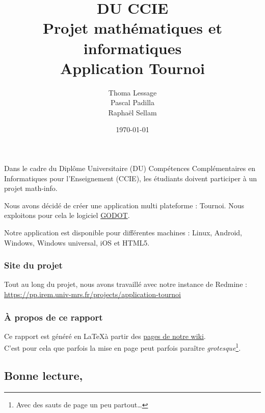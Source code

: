 \documentclass[10pt]{article}
\title{%
DU CCIE
\\
{\normalsize Projet mathématiques et informatiques}
\\
Application Tournoi}
\author{    Thoma Lessage\\
            Pascal Padilla\\
            Raphaël Sellam
    }
\date{\today}
\begin{document}
\pagecolor{orangeamu!25}
\maketitle\thispagestyle{empty}





\newpage\pagecolor{orangeamu!10}
\tableofcontents






\newpage


Dans le cadre du Diplôme Universitaire (DU) Compétences Complémentaires en Informatiques pour l'Enseignement (CCIE), les étudiants doivent participer à un projet math-info.

Nous avons décidé de créer une application multi plateforme : Tournoi. Nous exploitons pour cela le logiciel \href{https://godotengine.org/}{GODOT}.

Notre application est disponible pour différentes machines : Linux, Android, Windows, Windows universal, iOS et HTML5.





\subsubsection*{Site du projet}


Tout au long du projet, nous avons travaillé avec notre instance de Redmine : 
\url{https://pp.irem.univ-mrs.fr/projects/application-tournoi}




\subsubsection*{À propos de ce rapport}

Ce rapport est généré en \LaTeX à partir des \href{https://pp.irem.univ-mrs.fr/projects/application-tournoi/wiki/Wiki}{pages de notre wiki}.
\\
C'est pour cela que parfois la mise en page peut parfois paraître \textit{grotesque}\footnote{Avec des sauts de page un peu partout\ldots}.




\subsection*{Bonne lecture,}
\end{document}
